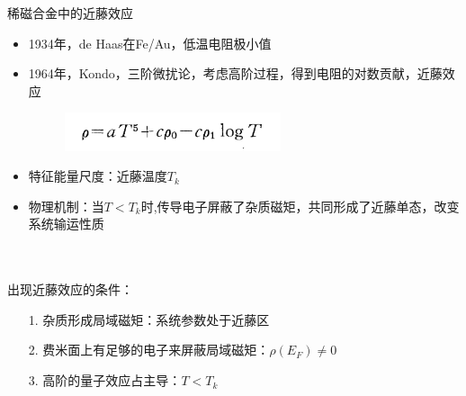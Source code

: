 \documentclass[9pt,t]{beamer} %
\begin{document}
\begin{frame}{稀磁合金中的近藤效应}
\begin{minipage}[t]{0.6 \textwidth}
\begin{itemize}
\setlength\itemsep{0.1em}
\item 1934年，de Haas在Fe/Au，低温电阻极小值
\item 1964年，Kondo，三阶微扰论，考虑高阶过程，得到电阻的对数贡献，近藤效应
\begin{figure}
\centering
\includegraphics[width=0.6\textwidth]{kondo-resistivity.png}
\end{figure}
\item 特征能量尺度：近藤温度$T_{k}$
\item 物理机制：当$T<T_{k}$时,传导电子屏蔽了杂质磁矩，共同形成了近藤单态，改变系统输运性质
\end{itemize}
\ \\ \ \\
出现近藤效应的条件：
\begin{itemize}
\item[1.] 杂质形成局域磁矩：系统参数处于近藤区
\item[2.] 费米面上有足够的电子来屏蔽局域磁矩：$\rho(E_{F})\neq 0$
\item[3.] 高阶的量子效应占主导：$T<T_{k}$
\end{itemize}
\end{minipage}
\end{frame}
\end{document}
